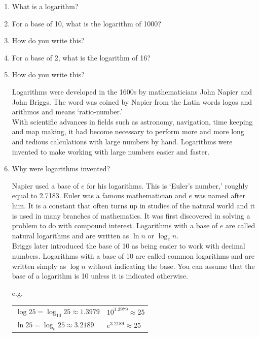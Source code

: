 \documentclass[12pt]{article}
\begin{document}
\begin{enumerate}

\item What is a logarithm?
\item For a base of 10, what is the logarithm of 1000?
\item How do you write this?
\item For a base of 2, what is the logarithm of 16?
\item How do you write this?

Logarithms were developed in the 1600s by mathematicians John Napier and John Briggs. The word was coined by Napier from the Latin words logos and arithmos and means ‘ratio-number.’\\

With scientific advances in fields such as astronomy, navigation, time keeping and map making, it had become necessary to perform more and more long and tedious calculations with large numbers by hand. Logarithms were invented to make working with large numbers easier and faster.\\

\item Why were logarithms invented?

Napier used a base of $e$ for his logarithms. This is ‘Euler’s number,’ roughly equal to 2.7183. Euler was a famous mathematician and $e$ was named after him. It is a constant that often turns up in studies of the natural world and it is used in many branches of mathematics. It was first discovered in solving a problem to do with compound interest. Logarithms with a base of $e$ are called natural logarithms and are written as $\ln n$ or $\log_e n$.\\

Briggs later introduced the base of 10 as being easier to work with decimal numbers. Logarithms with a base of 10 are called common logarithms and are written simply as $\log n$ without indicating the base. You can assume that the base of a logarithm is 10 unless it is indicated otherwise.

\begin{center}
e.g.
\begin{tabular}{ l l }
$\log{25}=\log_{10}25\approx1.3979$ & $10^{1.3979}\approx25$\\
$\ln 25=\log_{e}25\approx3.2189$ & $e^{3.2189}\approx25$\\
\end{tabular}
\end{center}


\end{enumerate}
\end{document}
